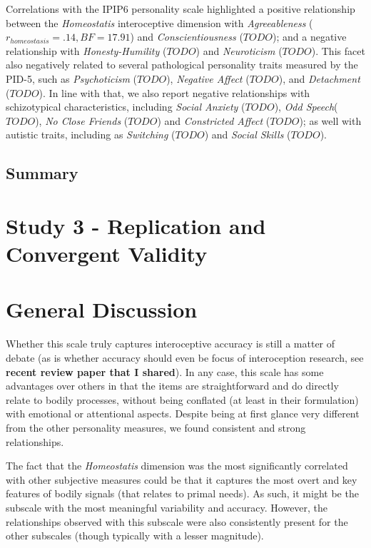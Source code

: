 \documentclass[
  man,floatsintext]{apa6}
\begin{document}
Correlations with the IPIP6 personality scale highlighted a positive relationship between the \emph{Homeostatis} interoceptive dimension with \emph{Agreeableness} (\(r_{homeostasis} = .14, BF = 17.91\)) and \emph{Conscientiousness} (\(TODO\)); and a negative relationship with \emph{Honesty-Humility} (\(TODO\)) and \emph{Neuroticism} (\(TODO\)). This facet also negatively related to several pathological personality traits measured by the PID-5, such as \emph{Psychoticism} (\(TODO\)), \emph{Negative Affect} (\(TODO\)), and \emph{Detachment} (\(TODO\)). In line with that, we also report negative relationships with schizotypical characteristics, including \emph{Social Anxiety} (\(TODO\)), \emph{Odd Speech}(\(TODO\)), \emph{No Close Friends} (\(TODO\)) and \emph{Constricted Affect} (\(TODO\)); as well with autistic traits, including as \emph{Switching} (\(TODO\)) and \emph{Social Skills} (\(TODO\)).

\hypertarget{summary-1}{%
\subsection{Summary}\label{summary-1}}

\hypertarget{study-3---replication-and-convergent-validity}{%
\section{Study 3 - Replication and Convergent Validity}\label{study-3---replication-and-convergent-validity}}

\hypertarget{general-discussion}{%
\section{General Discussion}\label{general-discussion}}

Whether this scale truly captures interoceptive accuracy is still a matter of debate (as is whether accuracy should even be focus of interoception research, see \textbf{recent review paper that I shared}). In any case, this scale has some advantages over others in that the items are straightforward and do directly relate to bodily processes, without being conflated (at least in their formulation) with emotional or attentional aspects. Despite being at first glance very different from the other personality measures, we found consistent and strong relationships.

The fact that the \emph{Homeostatis} dimension was the most significantly correlated with other subjective measures could be that it captures the most overt and key features of bodily signals (that relates to primal needs). As such, it might be the subscale with the most meaningful variability and accuracy. However, the relationships observed with this subscale were also consistently present for the other subscales (though typically with a lesser magnitude).
\end{document}
